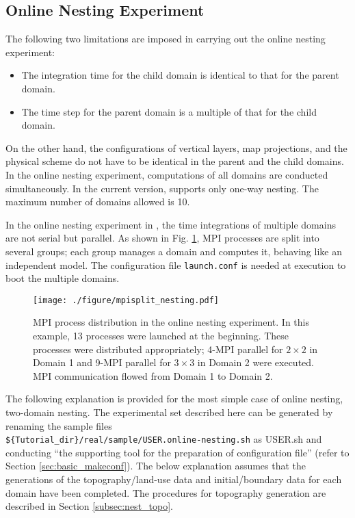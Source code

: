 \subsection{Online Nesting Experiment} \label{subsec:nest_online}

The following two limitations are imposed in carrying out the online nesting experiment:
\begin{itemize}
\item The integration time for the child domain is identical to that for the parent domain.
\item The time step for the parent domain is a multiple of that for the child domain.
\end{itemize}
On the other hand, the configurations of vertical layers, map projections, and the physical scheme do not have to be identical in the parent and the child domains. In the online nesting experiment, computations of all domains are conducted simultaneously. In the current version, \scalerm supports only one-way nesting. The maximum number of domains allowed is 10.

In the online nesting experiment in \scalerm, the time integrations of multiple domains are not serial but parallel. As shown in Fig. \ref{fig_mpisplit}, MPI processes are split into several groups; each group manages a domain and computes it, behaving like an independent model. The configuration file \verb|launch.conf| is needed at execution to boot the multiple domains.

\begin{figure}[tbh]
\begin{center}
  \texttt{[image: ./figure/mpisplit\_nesting.pdf]}\\
  \caption{ MPI process distribution in the online nesting experiment. In this example,   13 processes were launched at the beginning. These processes were distributed appropriately;     4-MPI parallel for $2 \times 2$ in Domain 1 and 9-MPI parallel for $3 \times 3$ in Domain 2 were executed.     MPI communication flowed from Domain 1 to Domain 2.
  }
  \label{fig_mpisplit}
\end{center}
\end{figure}

The following explanation is provided for the most simple case of online nesting, two-domain nesting.
The experimental set described here can be generated by renaming the sample files \\
\verb|${Tutorial_dir}/real/sample/USER.online-nesting.sh|
as USER.sh and conducting ``the supporting tool for the preparation of configuration file'' (refer to Section \ref{sec:basic_makeconf}).
The below explanation assumes that the generations of the topography/land-use data and initial/boundary data for each domain have been completed. The procedures for topography generation are described in Section \ref{subsec:nest_topo}.


